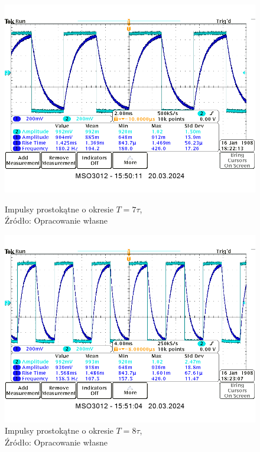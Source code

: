 \documentclass{article}
\begin{document}
    \begin{figure}[!ht]
      \centering
      \begin{minipage}{.4\textwidth}
        \centering
        \includegraphics[scale=0.3]{grafiki/7t.png}
        \caption{Impulsy prostokątne o okresie $T = 7 \tau$,
          \\Źródło: Opracowanie własne}
      \end{minipage}
      \begin{minipage}{.4\textwidth}
        \centering
        \includegraphics[scale=0.3]{grafiki/8t.png}
        \caption{Impulsy prostokątne o okresie $T = 8 \tau$,
        \\Źródło: Opracowanie własne}
      \end{minipage}
    \end{figure}
\end{document}
